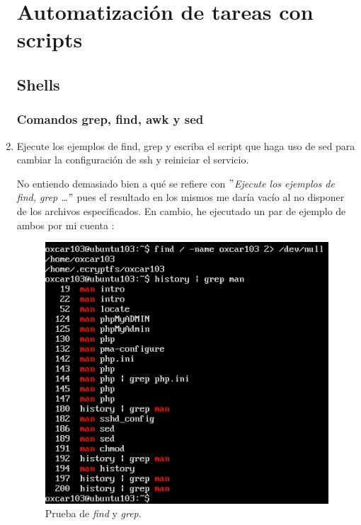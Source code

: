 \documentclass[paper=a4, fontsize=11pt]{scrartcl} %
\numberwithin{equation}{section} %
\numberwithin{figure}{section} %
\numberwithin{table}{section} %
\begin{document}
\begin{enumerate}
	\section{Automatización de tareas con scripts}
	\subsection{Shells}
	\subsubsection*{Comandos grep, find, awk y sed}
		\item Ejecute los ejemplos de find, grep y escriba el script que haga uso de sed para cambiar
		la configuración de ssh y reiniciar el servicio.
		
		No entiendo demasiado bien a qué se refiere con \textit{$"$Ejecute los ejemplos de find, grep
		\dots$"$} pues el resultado en los mismos me daría vacío al no disponer de los archivos
		especificados. En cambio, he ejecutado un par de ejemplo de ambos por mi cuenta\cite{man_find}
		\cite{man_grep}:
		
		\begin{figure}[H]
			\centering
			\includegraphics[width=15cm]{Ejercicio_22a.jpg}
			\caption{Prueba de \textit{find} y \textit{grep}.}
			\label{fig:examples}
		\end{figure}
		

\end{enumerate}
\end{document}
